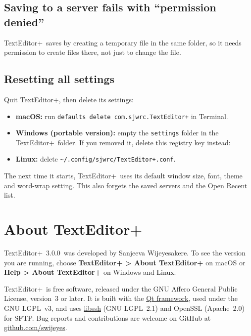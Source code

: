 \documentclass[11pt,a4paper]{article}
\newcommand{\appname}{TextEditor+}
\newcommand{\version}{3.0.0}
\newcommand{\menu}[1]{\textsf{\textbf{#1}}}
\begin{document}
\subsection*{Saving to a server fails with ``permission denied''}
\appname\ saves by creating a temporary file in the same folder, so it needs
permission to create files there, not just to change the file.

\subsection*{Resetting all settings}\label{sec:reset}
Quit \appname, then delete its settings:

\begin{itemize}
  \item \textbf{macOS:} run \texttt{defaults delete com.sjwrc.TextEditor+} in
        Terminal.
  \item \textbf{Windows (portable version):} empty the \texttt{settings}
        folder in the \appname\ folder. If you removed it, delete this registry key instead:\\
  \item \textbf{Linux:} delete \texttt{\textasciitilde/.config/sjwrc/TextEditor+.conf}.
\end{itemize}

The next time it starts, \appname\ uses its default window size, font, theme
and word-wrap setting. This also
forgets the saved servers and the Open Recent list.

\section{About \appname}

\appname\ \version\ was developed by Sanjeeva Wijeyesakere. To see the version you
are running, choose \menu{\appname{} > About \appname} on macOS or
\menu{Help > About \appname} on Windows and Linux.

\appname\ is free software, released under the GNU Affero General Public
License, version~3 or later. It is built with the
\href{https://www.qt.io/}{Qt framework}, used under the GNU LGPL~v3, and uses
\href{https://www.libssh.org/}{libssh} (GNU LGPL~2.1) and OpenSSL (Apache~2.0)
for SFTP. Bug reports
and contributions are welcome on GitHub at
\href{https://github.com/swijeyes}{github.com/swijeyes}.
\end{document}
